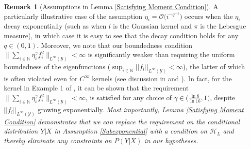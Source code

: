 \documentclass[accepted]{article}
\theoremstyle{definition}
\newtheorem*{remark}{Remark}
\begin{document}
\begin{remark}[Assumptions in Lemma \ref{Satisfying Moment Condition}]
A particularly illustrative case of the assumption $\eta_i = \mathcal{O}\Big(i^{-q^{-1}}\Big)$ occurs when the $\eta_i$ decay exponentially (such as when $l$ is the Gaussian kernel and $\pi$ is the Lebesgue measure), in which case it is easy to see that the decay condition holds for any $q \in (0, 1)$. Moreover, we note that our boundedness condition $\Big\|\sum_{i \in \mathbb{N}} \eta^{\gamma}_i f^2_i\Big\|_{L^{\infty}(\mathcal{Y})} < \infty$ is significantly weaker than requiring the uniform boundedness of the eigenfunctions ($\sup_{i \in \mathbb{N}} ||f_i||_{L^{\infty}(\mathcal{Y})} < \infty$), the latter of which is often violated even for $C^{\infty}$ kernels (see discussion in \cite{steinwart2012mercer} and \cite{zhou2002covering}). In fact, for the kernel in Example 1 of \cite{zhou2002covering}, it can be shown that the requirement $\Big\|\sum_{i \in \mathbb{N}} \eta^{\gamma}_i f^2_i\Big\|_{L^{\infty}(\mathcal{Y})} < \infty$, is satisfied for any choice of $\gamma \in \Big(\frac{\ln 8}{\ln 16}, 1\Big)$, despite $||f_i||_{L^{\infty}(\mathcal{Y})}$ growing exponentially. \textit{Most importantly, Lemma \ref{Satisfying Moment Condition} demonstrates that we can replace the requirement on the conditional distribution $Y|X$ in Assumption \ref{Subexponential} with a condition on $\mathcal{H}_L$ and thereby eliminate any constraints on $P(Y|X)$ in our hypotheses.}
\end{remark}
\end{document}
